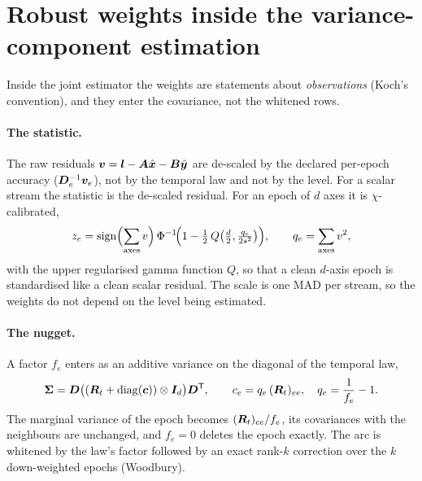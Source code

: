 \section{Robust weights inside the variance-component estimation}\label{sec:robustvce}

Inside the joint estimator the weights are statements about \emph{observations} (Koch's
convention), and they enter the covariance, not the whitened rows.

\paragraph{The statistic.} The raw residuals $\bm{v}=\bm{l}-\bm{A}\hat{\bm{x}}-\bm{B}\hat{\bm{y}}$ are
de-scaled by the declared per-epoch accuracy ($\bm{D}_e^{-1}\bm{v}_e$), not by the temporal law and not
by the level. For a scalar stream the statistic is the de-scaled residual. For an epoch of $d$ axes
it is $\chi$-calibrated,
\begin{equation}
z_e=\operatorname{sign}\Bigl(\sum_{\mathrm{axes}}v\Bigr)\,\Phi^{-1}\!\Bigl(1-\tfrac12\,Q\bigl(\tfrac d2,\tfrac{q_e}{2s^2}\bigr)\Bigr),\qquad
q_e=\sum_{\mathrm{axes}}v^2 ,
\end{equation}
with the upper regularised gamma function $Q$, so that a clean $d$-axis epoch is standardised like
a clean scalar residual. The scale is one MAD per stream, so the weights do not depend on the level
being estimated.

\paragraph{The nugget.} A factor $f_e$ enters as an additive variance on the diagonal of the
temporal law,
\begin{equation}\label{eq:nugget}
\bm{\Sigma}=\bm{D}\bigl((\bm{R}_t+\operatorname{diag}(\bm{c}))\otimes\bm{I}_d\bigr)\bm{D}^{\mathsf T},\qquad c_e=q_e\,(\bm{R}_t)_{ee},\quad q_e=\frac1{f_e}-1 .
\end{equation}
The marginal variance of the epoch becomes $(\bm{R}_t)_{ee}/f_e$, its covariances with the
neighbours are unchanged, and $f_e=0$ deletes the epoch exactly. The arc is whitened by the law's
factor followed by an exact rank-$k$ correction over the $k$ down-weighted epochs (Woodbury).

